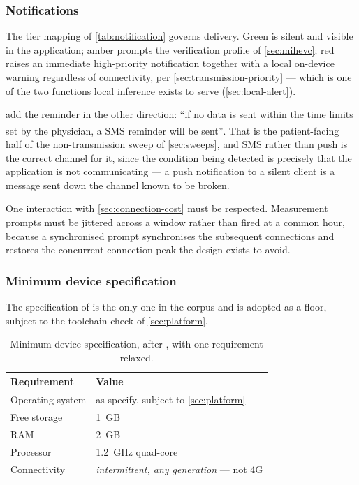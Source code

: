 \documentclass[12pt,a4paper,oneside]{report}
\newcommand{\bq}[1]{``#1''\textsuperscript{\dag}}
\begin{document}
\subsubsection{Notifications}\label{sec:app-notifications}

The tier mapping of \cref{tab:notification} governs delivery. Green is silent and visible in the application; amber prompts the verification profile of \cref{sec:mihevc}; red raises an immediate high-priority notification together with a local on-device warning regardless of connectivity, per \cref{sec:transmission-priority} --- which is one of the two functions local inference exists to serve (\cref{sec:local-alert}).

\Textcite{yazdani2018} add the reminder in the other direction: \bq{if no data is sent within the time limits set by the physician, a SMS reminder will be sent}. That is the patient-facing half of the non-transmission sweep of \cref{sec:sweeps}, and SMS rather than push is the correct channel for it, since the condition being detected is precisely that the application is not communicating --- a push notification to a silent client is a message sent down the channel known to be broken.

One interaction with \cref{sec:connection-cost} must be respected. Measurement prompts must be jittered across a window rather than fired at a common hour, because a synchronised prompt synchronises the subsequent connections and restores the concurrent-connection peak the design exists to avoid.

\subsubsection{Minimum device specification}\label{sec:device-spec}

The specification of \textcite{efendi2025} is the only one in the corpus and is adopted as a floor, subject to the toolchain check of \cref{sec:platform}.

\begin{table}[htbp]
\centering\small
\caption{Minimum device specification, after \textcite{efendi2025}, with one requirement relaxed.}\label{tab:device-spec}
\begin{tabularx}{\textwidth}{@{}>{\raggedright\arraybackslash}p{4.0cm} X@{}}
\toprule
\textbf{Requirement} & \textbf{Value} \\
\midrule
Operating system & as \textcite{efendi2025} specify, subject to \cref{sec:platform} \\
Free storage & 1~GB \\
RAM & 2~GB \\
Processor & 1.2~GHz quad-core \\
Connectivity & \emph{intermittent, any generation} --- not 4G \\
\bottomrule
\end{tabularx}
\end{table}
\end{document}
